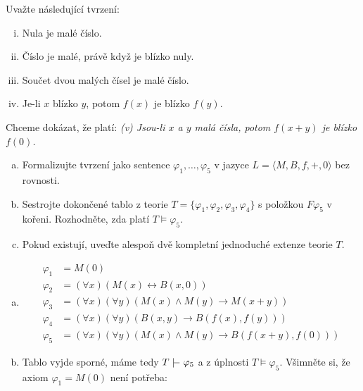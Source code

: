 \begin{problem}

    Uvažte následující tvrzení:
    \begin{enumerate}[(i)] \it 
        \item Nula je malé číslo.
        \item Číslo je malé, právě když je blízko nuly.
        \item Součet dvou malých čísel je malé číslo.
        \item Je-li $x$ blízko $y$, potom $f(x)$ je blízko $f(y)$.
    \end{enumerate}

    Chceme dokázat, že platí: {\it (v) Jsou-li $x$ a $y$ malá čísla, potom $f(x+y)$ je blízko $f(0)$.}

    \begin{enumerate}[(a)]
        \item Formalizujte tvrzení jako sentence $\varphi_1,\dots,\varphi_5$ v jazyce $L=\langle M,B,f,+,0\rangle$ bez rovnosti.        
        \item Sestrojte dokončené tablo z teorie $T=\{\varphi_1,\varphi_2,\varphi_3,\varphi_4\}$ s položkou $F\varphi_5$ v kořeni. Rozhodněte, zda platí $T\models \varphi_5$.
        \item Pokud existují, uveďte alespoň dvě kompletní jednoduché extenze teorie $T$.
    \end{enumerate}

    \begin{solution}

        \begin{enumerate}[(a)]
            \item \begin{align*}
                \varphi_1 & = M(0) \\
                \varphi_2 & = (\forall x)(M(x)\leftrightarrow B(x,0)) \\
                \varphi_3 & = (\forall x)(\forall y)(M(x)\wedge M(y)\to M(x+y)) \\
                \varphi_4 & = (\forall x)(\forall y)(B(x,y)\to B(f(x),f(y))) \\
                \varphi_5 & = (\forall x)(\forall y)(M(x)\wedge M(y)\to B(f(x+y),f(0)))
            \end{align*}

            \item Tablo vyjde sporné, máme tedy $T\proves \varphi_5$ a z úplnosti $T\models \varphi_5$. Všimněte si, že axiom $\varphi_1 = M(0)$ není potřeba:
            

\end{enumerate}
\end{solution}
\end{problem}

